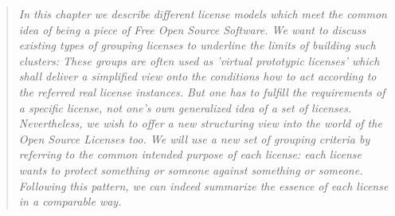 %
%
%
%
%


\footnotesize \begin{quote}\itshape In this chapter we describe different
license models which meet the common idea of being a piece of Free Open Source
Software. We want to discuss existing types of grouping licenses to underline
the limits of building such clusters: These groups are often used as 'virtual
prototypic licenses' which shall deliver a simplified view onto the conditions
how to act according to the referred real license instances. But one has to
fulfill the requirements of a specific license, not one's own generalized idea
of a set of licenses. Nevertheless, we wish to offer a new structuring view into
the world of the Open Source Licenses too. We will use a new set of grouping
criteria by referring to the common intended purpose of each license: each
license wants to protect something or someone against something or someone.
Following this pattern, we can indeed summarize the essence of each license in a
comparable way.
\end{quote}
\normalsize{}

